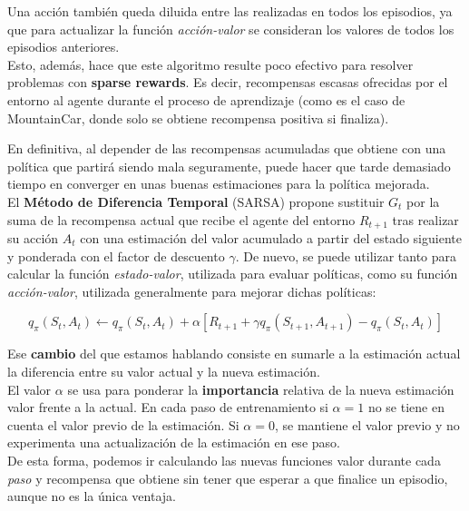 \documentclass[11pt,fleqn]{book} %
\begin{document}
Una acción también queda diluida entre las realizadas en todos los episodios, ya que para actualizar la función \textit{acción-valor} se consideran los valores de todos los episodios anteriores. \\

Esto, además, hace que este algoritmo resulte poco efectivo para resolver problemas con \textbf{sparse rewards}. Es decir, recompensas escasas ofrecidas por el entorno al agente durante el proceso de aprendizaje (como es el caso de MountainCar, donde solo se obtiene recompensa positiva si finaliza). \cite{article:sparse}

En definitiva, al depender de las recompensas acumuladas que obtiene con una política que partirá siendo mala seguramente, puede hacer que tarde demasiado tiempo en converger en unas buenas estimaciones para la política mejorada. \\

El \textbf{Método de Diferencia Temporal} (SARSA) \cite{book:miguel} \cite{article:RLromero} propone sustituir $G_{t}$ por la suma de la recompensa actual que recibe el agente del entorno $R_{t+1}$ tras realizar su acción $A_t$ con una estimación del valor acumulado a partir del estado siguiente y ponderada con el factor de descuento $\gamma$. De nuevo, se puede utilizar tanto para calcular la función \textit{estado-valor}, utilizada para evaluar políticas, como su función \textit{acción-valor}, utilizada generalmente para mejorar dichas políticas:

\begin{equation}
q_\pi(S_t,A_t) \leftarrow q_\pi(S_t,A_t)+\alpha\left[R_{t+1}+\gamma q_\pi(S_{t+1},A_{t+1}) - q_\pi(S_t,A_t)\right]
\end{equation}

Ese \textbf{cambio} del que estamos hablando consiste en sumarle a la estimación actual la diferencia entre su valor actual y la nueva estimación.\\

El valor $\alpha$ se usa para ponderar la \textbf{importancia} relativa de la nueva estimación valor frente a la actual. En cada paso de entrenamiento si $\alpha=1$ no se tiene en cuenta el valor previo de la estimación. Si $\alpha=0$, se mantiene el valor previo y no experimenta una actualización de la estimación en ese paso.\\

De esta forma, podemos ir calculando las nuevas funciones valor durante cada \textit{paso} y recompensa que obtiene sin tener que esperar a que finalice un episodio, aunque no es la única ventaja. \\
\end{document}
